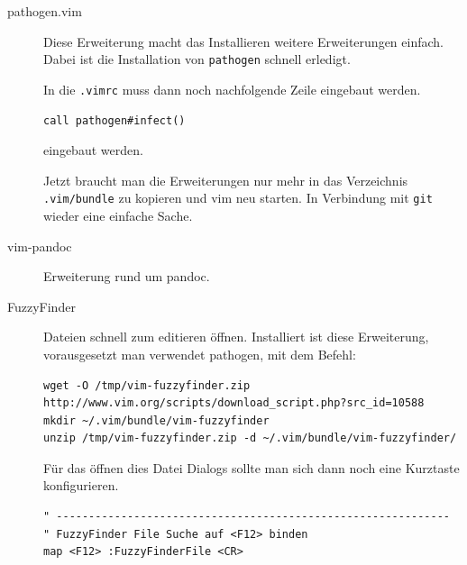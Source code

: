 \documentclass[%
fontsize=12pt,%
parskip=half,%
version=last%
]{scrreprt}
\begin{document}
\begin{description}
\item[pathogen.vim]
Diese Erweiterung macht das Installieren weitere Erweiterungen einfach.
Dabei ist die Installation von \texttt{pathogen} schnell erledigt.


In die \texttt{.vimrc} muss dann noch nachfolgende Zeile eingebaut
werden.

\begin{verbatim}
call pathogen#infect()
\end{verbatim}

eingebaut werden.

Jetzt braucht man die Erweiterungen nur mehr in das Verzeichnis
\texttt{.vim/bundle} zu kopieren und vim neu starten. In Verbindung mit
\texttt{git} wieder eine einfache Sache.


\item[vim-pandoc]
Erweiterung rund um pandoc.
\item[FuzzyFinder]
Dateien schnell zum editieren öffnen. Installiert ist diese Erweiterung,
vorausgesetzt man verwendet pathogen, mit dem Befehl:

\begin{verbatim}
wget -O /tmp/vim-fuzzyfinder.zip http://www.vim.org/scripts/download_script.php?src_id=10588
mkdir ~/.vim/bundle/vim-fuzzyfinder
unzip /tmp/vim-fuzzyfinder.zip -d ~/.vim/bundle/vim-fuzzyfinder/
\end{verbatim}

Für das öffnen dies Datei Dialogs sollte man sich dann noch eine
Kurztaste konfigurieren.

\begin{verbatim}
" -------------------------------------------------------------
" FuzzyFinder File Suche auf <F12> binden
map <F12> :FuzzyFinderFile <CR>
\end{verbatim}
\end{description}
\end{document}
